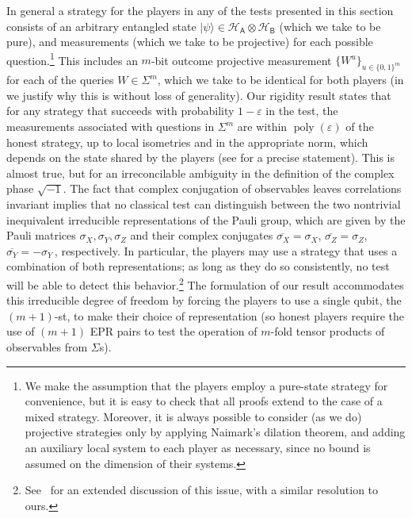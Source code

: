 \documentclass{toc}
\newcommand{\ket}[1]{|#1\rangle}
\DeclareMathOperator{\poly}{poly}
\newcommand{\reg}[1]{{\textsf{#1}}}
\newcommand{\mH}{\mathcal{H}}
\newcommand{\eps}{\varepsilon}
\begin{document}
In general a strategy for the players in any of the tests presented in this section consists of an arbitrary entangled state $\ket{\psi} \in \mH_\reg{A} \otimes \mH_\reg{B}$ (which we take to be pure), and measurements (which we take to be projective) for each possible question.\footnote{We make the assumption that the players employ a pure-state strategy for convenience, but it is easy to check that all proofs extend to the case of a mixed strategy. Moreover, it is always possible to consider (as we do)  projective strategies only by applying Naimark's dilation theorem, and adding an auxiliary local system to each player as necessary, since no bound is assumed on the dimension of their systems.} This includes an $m$-bit outcome projective measurement $\{W^u\}_{u\in\{0,1\}^{m}}$ for each of the queries $W\in\Sigma^m$, which we take to be identical for both players (in  we justify why this is without loss of generality). Our rigidity result states that for any strategy that succeeds with probability $1-\eps$ in the test, the measurements associated with questions in $\Sigma^m$ are within $\poly(\eps)$ of the honest strategy, up to local isometries and in the appropriate norm, which depends on the state shared by the players (see  for a precise statement). This is almost true, but for an irreconcilable ambiguity in the definition of the complex phase $\sqrt{-1}$. The fact that complex conjugation of observables 
leaves correlations invariant implies that no classical test can distinguish between the two nontrivial inequivalent irreducible representations of the Pauli group, which are given by the Pauli matrices $\sigma_X,\sigma_Y,\sigma_Z$ and their complex conjugates $\overline{\sigma_X}=\sigma_X$, $\overline{\sigma_Z}=\sigma_Z$, 
$\overline{\sigma_Y}=-\sigma_Y$\,, %
 respectively. In particular, the players may use a strategy that uses a combination of both representations; as long as they do so consistently, no test will be able to detect this behavior.\footnote{See~\cite[Appendix A]{reichardt2012classicalarxiv} for an extended discussion of this issue, with a similar resolution to ours.}  The formulation of our result accommodates this irreducible degree of freedom by forcing the players to use a single qubit, the $(m+1)$-st, to make their choice of representation (so honest players require the use of $(m+1)$ EPR pairs to test the operation of $m$-fold tensor products of observables from $\Sigma$s). 
\end{document}
